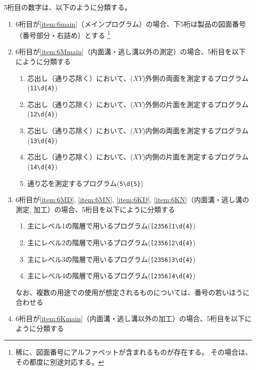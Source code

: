 5桁目の数字は、以下のように分類する。
\begin{enumerate}[label=\alph*)]
\item 6桁目が\ref{item:6main}（メインプログラム）の場合、下5桁は製品の図面番号（番号部分・右詰め）とする
\footnote{稀に、図面番号にアルファベットが含まれるものが存在する。
その場合は、その都度に別途対応する。}
\item 6桁目が\ref{item:6Mmain}（内面溝・逃し溝以外の測定）の場合、5桁目を以下にように分類する
  \begin{enumerate}[label=\arabic*., ref=\arabic*]
  \item\label{item:5MCOB} 芯出し（通り芯除く）において、($XY$)外側の両面を測定するプログラム(\verb|11\d{4}|)
  \item\label{item:5MCOO} 芯出し（通り芯除く）において、($XY$)外側の片面を測定するプログラム(\verb|12\d{4}|)
  \item\label{item:5MCIB} 芯出し（通り芯除く）において、($XY$)内側の両面を測定するプログラム(\verb|13\d{4}|)
  \item\label{item:5MCIO} 芯出し（通り芯除く）において、($XY$)内側の片面を測定するプログラム(\verb|14\d{4}|)
  \item\label{item:5MCL} 通り芯を測定するプログラム(\verb|5\d{5}|)
  \end{enumerate}
\item 6桁目が\ref{item:6MD}, \ref{item:6MN}, \ref{item:6KD}, \ref{item:6KN}（内面溝・逃し溝の測定, 加工）の場合、5桁目を以下にように分類する
  \begin{enumerate}[label=\arabic*., ref=\arabic*]
  \item 主にレベル1の階層で用いるプログラム(\verb|[2356]1\d{4}|)
  \item 主にレベル2の階層で用いるプログラム(\verb|[2356]2\d{4}|)
  \item 主にレベル3の階層で用いるプログラム(\verb|[2356]3\d{4}|)
  \item 主にレベル4の階層で用いるプログラム(\verb|[2356]4\d{4}|)
  \end{enumerate}
  なお、複数の用途での使用が想定されるものについては、番号の若いほうに合わせる
\item 6桁目が\ref{item:6Kmain}（内面溝・逃し溝以外の加工）の場合、5桁目を以下にように分類する
  \begin{enumerate}[label=\arabic*., ref=\arabic*, start=0]

\end{enumerate}
\end{enumerate}
